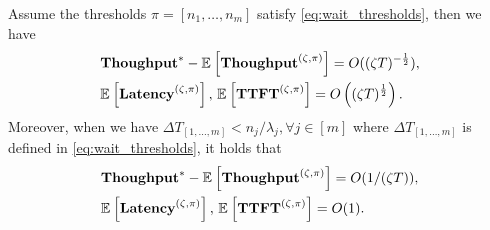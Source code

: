 

\begin{theorem}
\label{thm:wait_heavy_traffic}
    Assume the thresholds $\pi=[n_1,\dots,n_m]$ satisfy \eqref{eq:wait_thresholds}, then we have 
$$
\begin{aligned}
    &\textbf{Thoughput}^*-\mathbb{E}_{}\left[\textbf{Thoughput}^{(\zeta,\pi)}\right]=O((\zeta T)^{-\frac{1}{2}}),\\ 
&\mathbb{E}_{}\left[\textbf{Latency}^{(\zeta,\pi)}\right],\,\mathbb{E}_{}\left[\textbf{TTFT}^{(\zeta,\pi)}\right]=O\left({(\zeta T)^{\frac{1}{2}}}\right).
\end{aligned}
$$
    Moreover, when we have $\Delta T_{[1,\dots,m]}<n_j/\lambda_j,\forall j\in[m]$ where $\Delta T_{[1,\dots,m]}$ is defined in \eqref{eq:wait_thresholds}, it holds that
$$    \begin{aligned}
        &\textbf{Thoughput}^* - \mathbb{E}_{}\left[\textbf{Thoughput}^{(\zeta,\pi)}\right] = O(1/(\zeta T)), \\ 
&\mathbb{E}_{}\left[\textbf{Latency}^{(\zeta,\pi)}\right],\, \mathbb{E}_{}\left[\textbf{TTFT}^{(\zeta,\pi)}\right] = O(1).
    \end{aligned}$$
\end{theorem}



